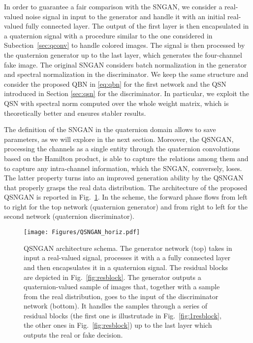 \documentclass[graybox]{svmult}
\begin{document}
In order to guarantee a fair comparison with the SNGAN, we consider a real-valued noise signal in input to the generator and handle it with an initial real-valued fully connected layer. The output of the first layer is then encapsulated in a quaternion signal with a procedure similar to the one considered in Subection~\ref{sec:qconv} to handle colored images. The signal is then processed by the quaternion generator up to the last layer, which generates the four-channel fake image. The original SNGAN considers batch normalization in the generator and spectral normalization in the discriminator. We keep the same structure and consider the proposed QBN in \eqref{eq:qbn} for the first network and the QSN introduced in Section \ref{sec:qsn} for the discriminator. In particular, we exploit the QSN with spectral norm computed over the whole weight matrix, which is theoretically better and ensures stabler results. 

The definition of the SNGAN in the quaternion domain allows to save parameters, as we will explore in the next section. Moreover, the QSNGAN, processing the channels as a single entity through the quaternion convolutions based on the Hamilton product, is able to capture the relations among them and to capture any intra-channel information, which the SNGAN, conversely, loses. The latter property turns into an improved generation ability by the QSNGAN that properly grasps the real data distribution. The architecture of the proposed QSNGAN is reported in Fig.~\ref{fig:qsngan}. In the scheme, the forward phase flows from left to right for the top network (quaternion generator) and from right to left for the second network (quaternion discriminator).



\begin{figure}[t]
    \centering
    \texttt{[image: Figures/QSNGAN\_horiz.pdf]}
    \caption{QSNGAN architecture schema. The generator network (top) takes in input a real-valued signal, processes it with a a fully connected layer and then encapsulates it in a quaternion signal. The residual blocks are depicted in Fig.~\ref{fig:resblock}. The generator outputs a quaternion-valued sample of images that, together with a sample from the real distribution, goes to the input of the discriminator network (bottom). It handles the samples through a series of residual blocks (the first one is illustrutade in Fig.~\ref{fig:1resblock}, the other ones in Fig.~\ref{fig:resblock}) up to the last layer which outputs the real or fake decision.}
    \label{fig:qsngan}
\end{figure}
\end{document}
